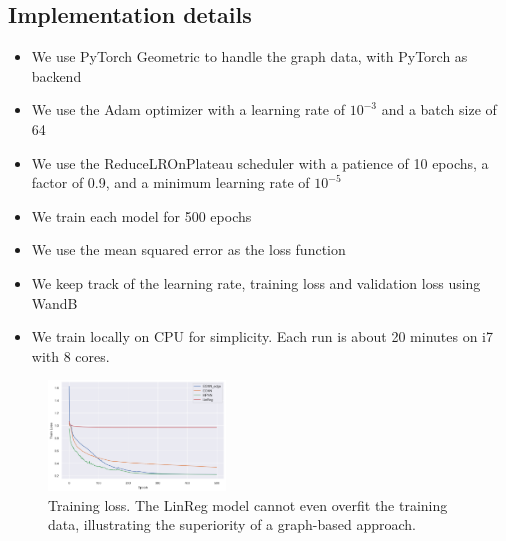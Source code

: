 \documentclass[sigconf]{acmart}
\begin{document}
\begin{table}[h!]
\centering
{}
\caption{Symmetry Properties of the Different Models}
\end{table}

\subsection{Implementation details}
\begin{itemize}
    \item We use PyTorch Geometric to handle the graph data, with PyTorch as backend
    \item We use the Adam optimizer with a learning rate of $10^{-3}$ and a batch size of 64
    \item We use the ReduceLROnPlateau scheduler with a patience of 10 epochs, a factor of 0.9, and a minimum learning rate of $10^{-5}$
    \item We train each model for 500 epochs
    \item We use the mean squared error as the loss function
    \item We keep track of the learning rate, training loss and validation loss using WandB
    \item We train locally on CPU for simplicity. Each run is about 20 minutes on i7 with 8 cores.
\end{itemize}

\begin{figure}
    \centering
    \includegraphics[width=0.42\textwidth]{figures/train_loss.png}
    \caption{Training loss. The LinReg model cannot even overfit the training data, illustrating the superiority of a graph-based approach.}
    \label{fig:training-loss}
\end{figure}
\end{document}
